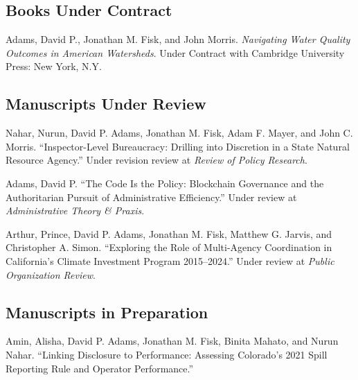 \documentclass[12pt,letterpaper]{article}
\renewenvironment{itemize}{
  \begin{list}{}{
    \setlength{\leftmargin}{1.5em}
    \setlength{\itemsep}{0.25em}
    \setlength{\parskip}{0pt}
    \setlength{\parsep}{0.25em}
  }
}{
  \end{list}
}
\begin{document}
\subsection*{Books Under Contract}

\begin{itemize}\leftmargin=2pt\itemindent=-15pt\leftmargin=2pt\itemindent=-15pt
    \item Adams, David P., Jonathan M. Fisk, and John Morris. \emph{Navigating Water Quality Outcomes in American Watersheds}. Under Contract with Cambridge University Press: New York, N.Y.
\end{itemize}

\subsection*{Manuscripts Under Review}
\begin{itemize}\leftmargin=2pt\itemindent=-15pt\leftmargin=2pt\itemindent=-15pt
  
    \item Nahar, Nurun, David P. Adams, Jonathan M. Fisk, Adam F. Mayer, and John C. Morris. ``Inspector-Level Bureaucracy: Drilling into Discretion in a State Natural Resource Agency.'' Under revision review at \emph{Review of Policy Research}.

    \item Adams, David P. ``The Code Is the Policy: Blockchain Governance and the Authoritarian Pursuit of Administrative Efficiency.'' Under review at \emph{Administrative Theory \& Praxis}.
    
    \item Arthur, Prince, David P. Adams, Jonathan M. Fisk, Matthew G. Jarvis, and Christopher A. Simon. ``Exploring the Role of Multi-Agency Coordination in California's Climate Investment Program 2015--2024.'' Under review at \emph{Public Organization Review}.

\end{itemize}

\subsection*{Manuscripts in Preparation}
  \begin{itemize} \leftmargin=2pt\itemindent=-15pt\leftmargin=2pt\itemindent=-15pt
    
    \item Amin, Alisha, David P. Adams, Jonathan M. Fisk, Binita Mahato, and Nurun Nahar. ``Linking Disclosure to Performance: Assessing Colorado's 2021 Spill Reporting Rule and Operator Performance.''
  \end{itemize}
\end{document}
